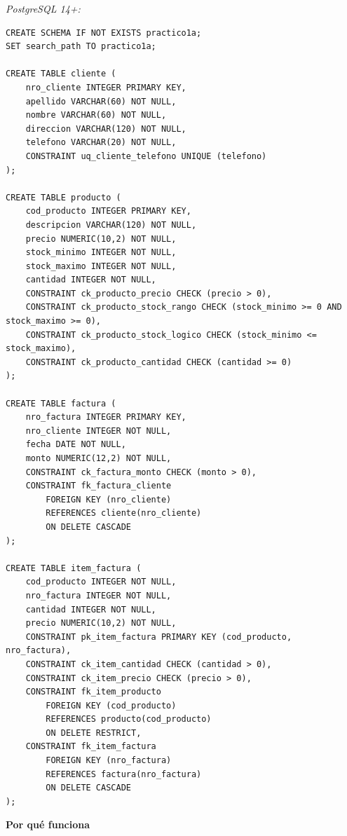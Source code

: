 \documentclass[11pt,a4paper]{article}
\newcommand{\itemcabecera}[1]{\noindent\textbf{#1}\par\medskip}
\newcommand{\bloquePorque}{\itemcabecera{Por qu\'e funciona}}
\begin{document}
\textit{PostgreSQL 14+:}

\begin{lstlisting}
CREATE SCHEMA IF NOT EXISTS practico1a;
SET search_path TO practico1a;

CREATE TABLE cliente (
    nro_cliente INTEGER PRIMARY KEY,
    apellido VARCHAR(60) NOT NULL,
    nombre VARCHAR(60) NOT NULL,
    direccion VARCHAR(120) NOT NULL,
    telefono VARCHAR(20) NOT NULL,
    CONSTRAINT uq_cliente_telefono UNIQUE (telefono)
);

CREATE TABLE producto (
    cod_producto INTEGER PRIMARY KEY,
    descripcion VARCHAR(120) NOT NULL,
    precio NUMERIC(10,2) NOT NULL,
    stock_minimo INTEGER NOT NULL,
    stock_maximo INTEGER NOT NULL,
    cantidad INTEGER NOT NULL,
    CONSTRAINT ck_producto_precio CHECK (precio > 0),
    CONSTRAINT ck_producto_stock_rango CHECK (stock_minimo >= 0 AND stock_maximo >= 0),
    CONSTRAINT ck_producto_stock_logico CHECK (stock_minimo <= stock_maximo),
    CONSTRAINT ck_producto_cantidad CHECK (cantidad >= 0)
);

CREATE TABLE factura (
    nro_factura INTEGER PRIMARY KEY,
    nro_cliente INTEGER NOT NULL,
    fecha DATE NOT NULL,
    monto NUMERIC(12,2) NOT NULL,
    CONSTRAINT ck_factura_monto CHECK (monto > 0),
    CONSTRAINT fk_factura_cliente
        FOREIGN KEY (nro_cliente)
        REFERENCES cliente(nro_cliente)
        ON DELETE CASCADE
);

CREATE TABLE item_factura (
    cod_producto INTEGER NOT NULL,
    nro_factura INTEGER NOT NULL,
    cantidad INTEGER NOT NULL,
    precio NUMERIC(10,2) NOT NULL,
    CONSTRAINT pk_item_factura PRIMARY KEY (cod_producto, nro_factura),
    CONSTRAINT ck_item_cantidad CHECK (cantidad > 0),
    CONSTRAINT ck_item_precio CHECK (precio > 0),
    CONSTRAINT fk_item_producto
        FOREIGN KEY (cod_producto)
        REFERENCES producto(cod_producto)
        ON DELETE RESTRICT,
    CONSTRAINT fk_item_factura
        FOREIGN KEY (nro_factura)
        REFERENCES factura(nro_factura)
        ON DELETE CASCADE
);
\end{lstlisting}

\bloquePorque
\end{document}
